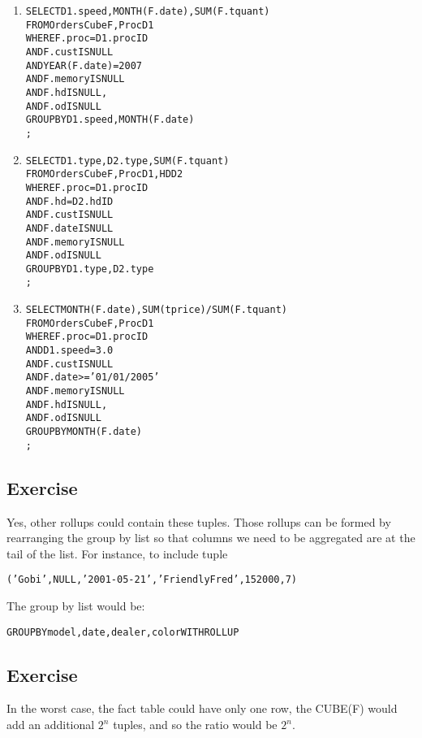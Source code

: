 \begin{enumerate}
\item
\begin{alltt}
SELECT D1.speed, MONTH(F.date), SUM(F.tquant)
FROM   OrdersCube F, Proc D1
WHERE  F.proc = D1.procID
  AND  F.cust IS NULL
  AND  YEAR(F.date) = 2007
  AND  F.memory IS NULL
  AND  F.hd IS NULL,
  AND  F.od IS NULL
GROUP BY D1.speed, MONTH(F.date)
;
\end{alltt}
\item
\begin{alltt}
SELECT D1.type, D2.type, SUM(F.tquant)
FROM   OrdersCube F, Proc D1, HD D2
WHERE  F.proc = D1.procID
  AND  F.hd   = D2.hdID
  AND  F.cust IS NULL
  AND  F.date IS NULL
  AND  F.memory IS NULL
  AND  F.od IS NULL
GROUP BY D1.type, D2.type
;
\end{alltt}
\item
\begin{alltt}
SELECT MONTH(F.date), SUM(tprice)/SUM(F.tquant)
FROM   OrdersCube F, Proc D1
WHERE  F.proc = D1.procID
  AND  D1.speed = 3.0
  AND  F.cust IS NULL
  AND  F.date >= '01/01/2005'
  AND  F.memory IS NULL
  AND  F.hd IS NULL,
  AND  F.od IS NULL
GROUP BY MONTH(F.date)
;
\end{alltt}
\end{enumerate}


\setcounter{subsection}{6}
\subsection*{Exercise \thesubsection}
Yes, other rollups could contain these tuples. Those rollups can be formed
by rearranging the group by list so that columns we need to be aggregated are
at the tail of the list. For instance, to include tuple
\begin{alltt}
('Gobi', NULL, '2001-05-21', 'Friendly Fred', 152000, 7)
\end{alltt}
The group by list would be:
\begin{alltt}
GROUP BY model, date, dealer, color WITH ROLLUP
\end{alltt}


\setcounter{subsection}{7}
\subsection*{Exercise \thesubsection}
In the worst case, the fact table could have only one row,
the CUBE(F) would add an additional $2^n$ tuples, and so the
ratio would be $2^n$.

